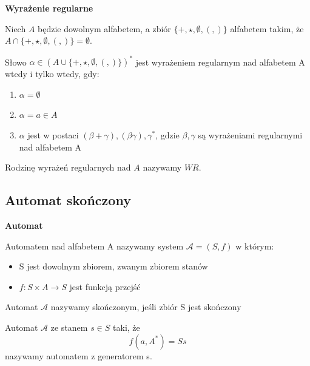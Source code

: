 \documentclass[12pt]{article}
\begin{document}
        \begin{definition}
            \textbf{Wyrażenie regularne}

            Niech $A$ będzie dowolnym alfabetem, a zbiór $\{+, \star, \emptyset, (,)\}$
            alfabetem takim, że $A \cap \{+, \star, \emptyset, (,)\} = \emptyset$.

            Słowo $\alpha \in (A \cup \{+, \star, \emptyset, (,)\})^*$ jest wyrażeniem regularnym
            nad alfabetem A wtedy i tylko wtedy, gdy:

            \begin{enumerate}
                \item $\alpha = \emptyset$
                \item $\alpha = a \in A$
                \item $\alpha$ jest w postaci $(\beta + \gamma), (\beta\gamma), \gamma^*$, gdzie 
                    $\beta, \gamma$ są wyrażeniami regularnymi nad alfabetem A
            \end{enumerate}
        \end{definition}

        Rodzinę wyrażeń regularnych nad $A$ nazywamy $WR$.

        \subsection{Automat skończony}

        \begin{definition}
            \textbf{Automat}

            Automatem nad alfabetem A nazywamy system $\mathcal{A} = (S, f)$ w którym:
            \begin{itemize}
                \item S jest dowolnym zbiorem, zwanym zbiorem stanów
                \item $f : S \times A \rightarrow S$ jest funkcją przejść
            \end{itemize}

            Automat $\mathcal{A}$ nazywamy skończonym, jeśli zbiór S jest skończony

            Automat $\mathcal{A}$ ze stanem $s \in S$ taki, że
            $$f(a, A^*) = Ss$$
            nazywamy automatem z generatorem s.
        \end{definition}
        
\end{document}
